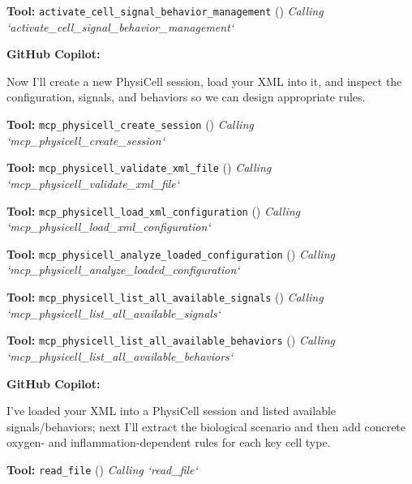 \documentclass[11pt,a4paper]{article}
\begin{document}
\begin{toolokbox}
\textbf{Tool:} \texttt{activate\_cell\_signal\_behavior\_management} (\checkmark)
\textit{Calling `activate\_cell\_signal\_behavior\_management`}
\end{toolokbox}
\begin{copilotbox}
\textbf{GitHub Copilot:}

Now I'll create a new PhysiCell session, load your XML into it, and inspect the configuration, signals, and behaviors so we can design appropriate rules.

\end{copilotbox}
\begin{toolokbox}
\textbf{Tool:} \texttt{mcp\_physicell\_create\_session} (\checkmark)
\textit{Calling `mcp\_physicell\_create\_session`}
\end{toolokbox}
\begin{toolokbox}
\textbf{Tool:} \texttt{mcp\_physicell\_validate\_xml\_file} (\checkmark)
\textit{Calling `mcp\_physicell\_validate\_xml\_file`}
\end{toolokbox}
\begin{toolokbox}
\textbf{Tool:} \texttt{mcp\_physicell\_load\_xml\_configuration} (\checkmark)
\textit{Calling `mcp\_physicell\_load\_xml\_configuration`}
\end{toolokbox}
\begin{toolokbox}
\textbf{Tool:} \texttt{mcp\_physicell\_analyze\_loaded\_configuration} (\checkmark)
\textit{Calling `mcp\_physicell\_analyze\_loaded\_configuration`}
\end{toolokbox}
\begin{toolokbox}
\textbf{Tool:} \texttt{mcp\_physicell\_list\_all\_available\_signals} (\checkmark)
\textit{Calling `mcp\_physicell\_list\_all\_available\_signals`}
\end{toolokbox}
\begin{toolokbox}
\textbf{Tool:} \texttt{mcp\_physicell\_list\_all\_available\_behaviors} (\checkmark)
\textit{Calling `mcp\_physicell\_list\_all\_available\_behaviors`}
\end{toolokbox}
\begin{copilotbox}
\textbf{GitHub Copilot:}

I’ve loaded your XML into a PhysiCell session and listed available signals/behaviors; next I’ll extract the biological scenario and then add concrete oxygen- and inflammation-dependent rules for each key cell type.

\end{copilotbox}
\begin{toolokbox}
\textbf{Tool:} \texttt{read\_file} (\checkmark)
\textit{Calling `read\_file`}
\end{toolokbox}
\end{document}
